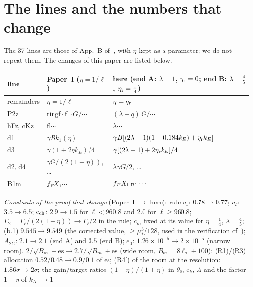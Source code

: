 \section{The lines and the numbers that change}
\label{app:B}

The 37 lines are those of App.~B of~\cite{I}, with $\eta$ kept as a parameter; we do not repeat them.
The changes of this paper are listed below.
\begin{center}
\footnotesize
\begin{tabular}{p{}p{}p{}}
line & Paper~I ($\eta=1/\ell$) & here (end A: $\lambda=1$, $\eta_{\rm r}=0$; end B: $\lambda=\tfrac45$, $\eta_{\rm r}=\tfrac14$)\\ \hline
remainders & $\eta=1/\ell$ & $\eta=\eta_{\rm r}$\\
P2z & $\mathrm{ringf}\cdot\mathrm{fl}\cdot G/\cdots$ & $(\lambda-q)\,G/\cdots$\\
hFz, cKz & $\mathrm{fl}\cdots$ & $\lambda\cdots$\\
d1 & $\gamma Bk_1(\eta)$ & $\gamma B[(2\lambda-1)(1+0.184k_E)+\eta_{\rm r}k_E]$\\
d3 & $\gamma(1+2\eta k_E)/4$ & $\gamma[(2\lambda-1)+2\eta_{\rm r}k_E]/4$\\
d2, d4 & $\gamma G/(2(1-\eta))$, \dots & $\lambda\gamma G/2$, \dots\\
B1m & $f_FX_1\cdots$ & $f_FX_{1,\rm B1}\cdots$\\
\end{tabular}
\end{center}

\emph{Constants of the proof that change} (Paper~I $\to$ here):
rule $c_1$: $0.78\to0.77$; $c_T$: $3.5\to6.5$; $c_{\rm ch}$: $2.9\to1.5$ for $\ell<960.8$ and $2.0$ for $\ell\ge960.8$; $\Gamma_2=\Gamma_\ell/(2(1-\eta))\to\Gamma_\ell/2$ in the rule; $c_m$ fixed at its value for $\eta=\tfrac14$, $\lambda=\tfrac45$;
(b.1) $9.545\to9.549$ (the corrected value, $\ge\mu_*^3/128$, used in the verification of~\cite{I});
$A_{2C}$: $2.1\to2.1$ (end A) and $3.5$ (end B);
$e_0$: $1.26\times10^{-5}\to2\times10^{-5}$ (narrow room), $2/\sqrt{B_m}+\mathrm{es}\to2.7/\sqrt{B_m}+\mathrm{es}$ (wide room, $B_m=8\ell_a+100$);
(R1)/(R3) allocation $0.52/0.48\to0.9/0.1$ of es;
(R4$'$) of the room at the resolution: $1.86\sigma\to2\sigma$;
the gain/target ratios $(1-\eta)/(1+\eta)$ in $\theta_0$, $c_k$, $A$ and the factor $1-\eta$ of $k_N$ $\to1$.



